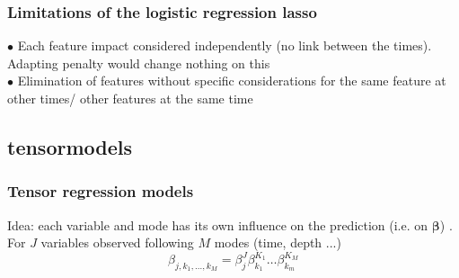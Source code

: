\documentclass{beamer}
\begin{document}
\begin{frame}
    \frametitle{Limitations of the logistic regression lasso}
        $\bullet$ Each feature impact considered independently (no link between the times). Adapting penalty would change nothing on this\\[15 pt]
        $\bullet$ Elimination of features without specific considerations for the same feature at other times/ other features at the same time\\[15 pt]


\end{frame}

\subsection{tensormodels}
\begin{frame}
    \frametitle{Tensor regression models}
    Idea: each variable and mode has its own influence on the prediction (i.e. on $\bm{\beta}$) \cite{multi_rank_1}.\\[10 pt]

    For $J$ variables observed following $M$ modes (time, depth ...)
    $$\beta_{j,k_1,\hdots,k_M} = \beta_j^J\beta_{k_1}^{K_1} \hdots \beta_{k_m}^{K_M}$$
\end{frame}
\end{document}

